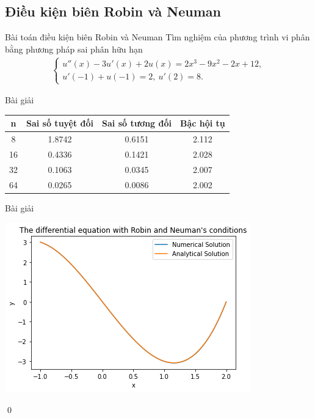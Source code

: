 \documentclass[9pt]{beamer}
\numberwithin{equation}{section}
\begin{document}
\subsection{Điều kiện biên Robin và Neuman}

\begin{frame}
\begin{block}{Bài toán điều kiện biên Robin và Neuman}
    Tìm nghiệm của phương trình vi phân bằng phương pháp sai phân hữu hạn
    \begin{align*}
    \begin{cases}
        u''(x) - 3u'(x) + 2u(x) = 2x^3 - 9x^2 - 2x + 12, \\
        u'(-1) + u(-1) = 2, \ u'(2) = 8.
    \end{cases}
    \end{align*}
\end{block}

\begin{exampleblock}{Bài giải}
    \begin{center}\begin{tabular}{||c|c|c|c||}
    \hline
    n & Sai số tuyệt đối & Sai số tương đối & Bậc hội tụ \\
    \hline\hline
    8   & 1.8742 & 0.6151 & 2.112 \\
    16  & 0.4336 & 0.1421 & 2.028 \\
    32  & 0.1063 & 0.0345 & 2.007 \\
    64  & 0.0265 & 0.0086 & 2.002 \\
    \hline
    \end{tabular}\end{center}
\end{exampleblock}
\end{frame}

\begin{frame}
\begin{exampleblock}{Bài giải}
    \begin{center}
        \includegraphics[scale=0.5]{img/midterm3}
    \end{center}
    \qed
\end{exampleblock} 
\end{frame}
\end{document}
